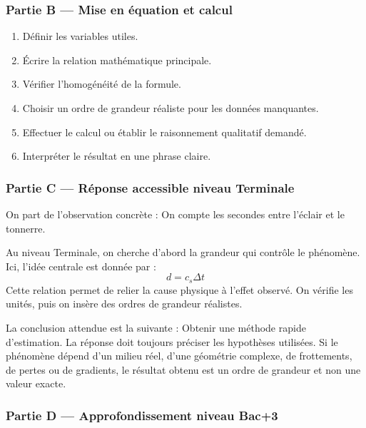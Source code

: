 \documentclass[11pt,a4paper]{article}
\begin{document}
\subsubsection*{Partie B — Mise en équation et calcul}

\begin{enumerate}
  \item Définir les variables utiles.
  \item Écrire la relation mathématique principale.
  \item Vérifier l'homogénéité de la formule.
  \item Choisir un ordre de grandeur réaliste pour les données manquantes.
  \item Effectuer le calcul ou établir le raisonnement qualitatif demandé.
  \item Interpréter le résultat en une phrase claire.
\end{enumerate}

\subsubsection*{Partie C — Réponse accessible niveau Terminale}

\begin{corrigebox}
On part de l'observation concrète : On compte les secondes entre l'éclair et le tonnerre.

Au niveau Terminale, on cherche d'abord la grandeur qui contrôle le phénomène. Ici, l'idée centrale est donnée par :
\[
d=c_s\Delta t
\]
Cette relation permet de relier la cause physique à l'effet observé. On vérifie les unités, puis on insère des ordres de grandeur réalistes.

La conclusion attendue est la suivante : Obtenir une méthode rapide d'estimation. La réponse doit toujours préciser les hypothèses utilisées. Si le phénomène dépend d'un milieu réel, d'une géométrie complexe, de frottements, de pertes ou de gradients, le résultat obtenu est un ordre de grandeur et non une valeur exacte.
\end{corrigebox}

\subsubsection*{Partie D — Approfondissement niveau Bac+3}
\end{document}
